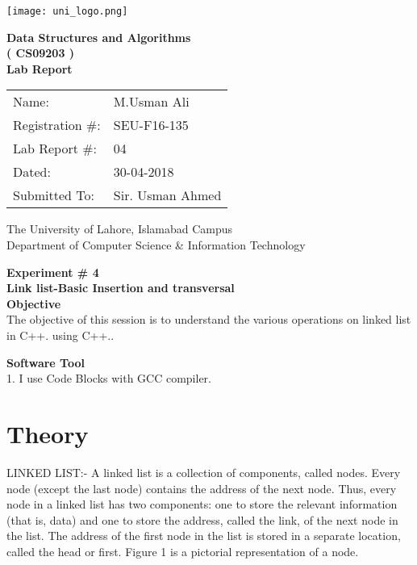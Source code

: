 \documentclass[11pt]{article}            %
\begin{document}
\begin{titlepage}
    \centering
  \vfill
    \texttt{[image: uni\_logo.png]} \\ 
	\vskip2cm
    {\bfseries\Large
	Data Structures and Algorithms \\ ( CS09203 )\\
	
	\vskip2cm
	Lab Report 
	 
	\vskip2cm
	}    


\begin{center}
\begin{tabular}{ l l  } 

Name: & M.Usman Ali \\ 
Registration \#: & SEU-F16-135 \\ 
Lab Report \#: & 04 \\ 
 Dated:& 30-04-2018\\ 
Submitted To:& Sir. Usman Ahmed\\ 

\end{tabular}
\end{center}
    \vfill
    The University of Lahore, Islamabad Campus\\
Department of Computer Science \& Information Technology
\end{titlepage}


    
    {\bfseries\Large
\centering
	Experiment \# 4 \\

Link list-Basic Insertion and transversal\\
	
	}    
 \vskip1cm
 \textbf {Objective}\\The objective of this session is to understand the various operations on linked list in C++.
using C++.. 
 
 \textbf {Software Tool}\\
1.  I use Code Blocks with GCC compiler.\\

\section{Theory }           LINKED LIST:-
A linked list is a collection of components, called nodes. Every node (except the last node)
contains the address of the next node. Thus, every node in a linked list has two components:
one to store the relevant information (that is, data) and one to store the address, called the link,
of the next node in the list. The address of the first node in the list is stored in a separate
location, called the head or first. Figure 1 is a pictorial representation of a node.
\end{document}

